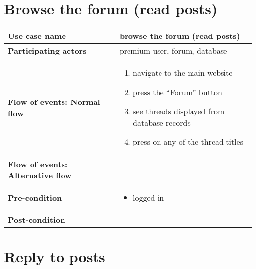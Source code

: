 \documentclass[a4paper, 13pt, draft]{report}
\begin{document}
\section*{Browse the forum (read posts)}

\begin{center}
	\begin{tabular}{| >{\bf}l | p{5.55cm} |} 
		\hline
		Use case name & browse the forum (read posts) \\ 
		\hline
		Participating actors & premium user, forum, database \\
		\hline
		Flow of events: Normal flow & 
		\begin{enumerate}		
			\item navigate to the main website
			\item press the ``Forum'' button
			\item see threads displayed from database records
			\item press on any of the thread titles
		\end{enumerate}	\\
		\hline
		Flow of events: Alternative flow & \notapplicable \\
		\hline
		Pre-condition & 
		\begin{itemize} 
			\item logged in
		\end{itemize} \\
		\hline
		Post-condition & \notapplicable \\
		\hline
	\end{tabular}
\end{center}

\section*{Reply to posts}
\end{document}
